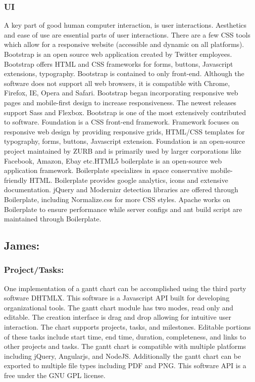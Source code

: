 \documentclass[letterpaper,10pt,titlepage,journal,compsoc,draftclsnofoot,onecolumn]{IEEEtran}
\newcommand\tab[1][1cm]{\hspace*{#1}}
\begin{document}
\subsubsection{UI}
\tab A key part of good human computer interaction, is user interactions. Aesthetics and ease of use are essential parts of user interactions. There are a few CSS tools which allow for a responsive website (accessible and dynamic on all platforms). \newline\newline\tab Bootstrap is an open source web application created by Twitter employees. Bootstrap offers HTML and CSS frameworks for forms, buttons, Javascript extensions, typography. Bootstrap is contained to only front-end. Although the software does not support all web browsers, it is compatible with Chrome, Firefox, IE, Opera and Safari. Bootstrap began incorporating responsive web pages and mobile-first design to increase responsiveness. The newest releases support Sass and Flexbox. Bootstrap is one of the most extensively contributed to software. \newline\newline\tab Foundation is a CSS front-end framework. Framework focuses on responsive web design by providing responsive grids, HTML/CSS templates for typography, forms, buttons, Javascript extension. Foundation is an open-source project maintained by ZURB and is primarily used by larger corporations like Facebook, Amazon, Ebay etc.\newline\newline\tab HTML5 boilerplate is an open-source web application framework. Boilerplate specializes in space conservative mobile-friendly HTML. Boilerplate provides google analytics, icons and extensive documentation. jQuery and Modernizr detection libraries are offered through Boilerplate, including Normalize.css for more CSS styles. Apache works on Boilerplate to ensure performance while server configs and ant build script are maintained through Boilerplate. \newline

\subsection{James:}
\subsubsection{Project/Tasks:}
\tab One implementation of a gantt chart can be accomplished using the third party software DHTMLX. This software is a Javascript API built for developing organizational tools. The gantt chart module has two modes, read only and editable. The creation interface is drag and drop allowing for intuitive user interaction. The chart supports projects, tasks, and milestones. Editable portions of these tasks include start time, end time, duration, completeness, and links to other projects and tasks. The gantt chart is compatible with multiple platforms including jQuery, Angularjs, and NodeJS. Additionally the gantt chart can be exported to multiple file types including PDF and PNG. This software API is a free under the GNU GPL license. \newline
\end{document}
